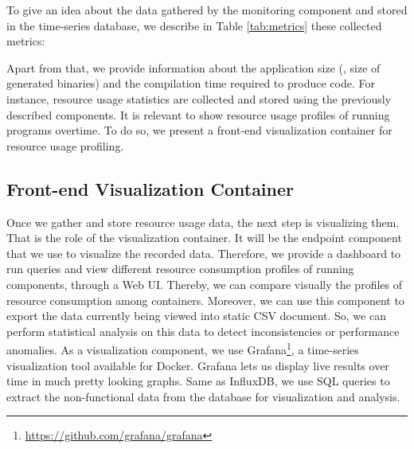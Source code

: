 To give an idea about the data gathered by the monitoring component and stored in the time-series database, we describe in Table \ref{tab:metrics} these collected metrics:
\begin{table}[h]
	\begin{center}
		
	\end{center}
	\caption {Resource usage metrics recorded in InfluxDB}
	\label{tab:metrics}
\end{table}

Apart from that, we provide information about the application size (\eg, size of generated binaries) and the compilation time required to produce code.
For instance, resource usage statistics are collected and stored using the previously described components. It is relevant to show resource usage profiles of running programs overtime. To do so, we present a front-end visualization container for resource usage profiling. 

\subsection{Front-end Visualization Container}

Once we gather and store resource usage data, the next step is visualizing them. That is the role of the visualization container. It will be the endpoint component that we use to visualize the recorded data. Therefore, we provide a dashboard to run queries and view different resource consumption profiles of running components, through a Web UI. Thereby, we can compare visually the profiles of resource consumption among containers. Moreover, we can use this component to export the data currently being viewed into static CSV document. So, we can perform statistical analysis on this data to detect inconsistencies or performance anomalies.
As a visualization component, we use Grafana\footnote{\url{https://github.com/grafana/grafana}}, a time-series visualization tool available for Docker. Grafana lets us display live results over time in much pretty looking graphs. Same as InfluxDB, we use SQL queries to extract the non-functional data from the database for visualization and analysis.

